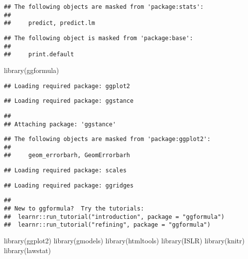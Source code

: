 \documentclass[
]{article}
\newenvironment{Shaded}{\begin{snugshade}}{\end{snugshade}}
\newcommand{\FunctionTok}[1]{\textcolor[rgb]{0.00,0.00,0.00}{#1}}
\newcommand{\NormalTok}[1]{#1}
\begin{document}
\begin{verbatim}
## The following objects are masked from 'package:stats':
## 
##     predict, predict.lm
\end{verbatim}

\begin{verbatim}
## The following object is masked from 'package:base':
## 
##     print.default
\end{verbatim}

\begin{Shaded}
\begin{Highlighting}[]
\FunctionTok{library}\NormalTok{(ggformula)}
\end{Highlighting}
\end{Shaded}

\begin{verbatim}
## Loading required package: ggplot2
\end{verbatim}

\begin{verbatim}
## Loading required package: ggstance
\end{verbatim}

\begin{verbatim}
## 
## Attaching package: 'ggstance'
\end{verbatim}

\begin{verbatim}
## The following objects are masked from 'package:ggplot2':
## 
##     geom_errorbarh, GeomErrorbarh
\end{verbatim}

\begin{verbatim}
## Loading required package: scales
\end{verbatim}

\begin{verbatim}
## Loading required package: ggridges
\end{verbatim}

\begin{verbatim}
## 
## New to ggformula?  Try the tutorials: 
##  learnr::run_tutorial("introduction", package = "ggformula")
##  learnr::run_tutorial("refining", package = "ggformula")
\end{verbatim}

\begin{Shaded}
\begin{Highlighting}[]
\FunctionTok{library}\NormalTok{(ggplot2)}
\FunctionTok{library}\NormalTok{(gmodels)}
\FunctionTok{library}\NormalTok{(htmltools)}
\FunctionTok{library}\NormalTok{(ISLR)}
\FunctionTok{library}\NormalTok{(knitr)}
\FunctionTok{library}\NormalTok{(lawstat)}
\end{Highlighting}
\end{Shaded}
\end{document}
